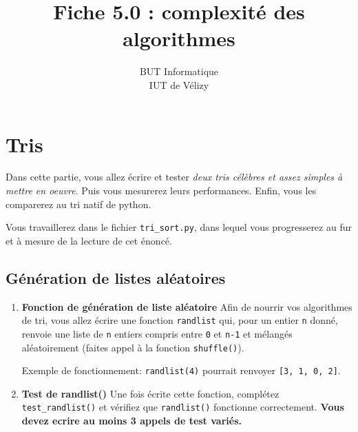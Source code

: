 \documentclass[11pt,a4paper]{article}
\title{Fiche 5.0 : complexité des algorithmes}
\author{BUT Informatique\\
IUT de Vélizy\\
}
\date{}
\newcommand{\checkbox}{$\square$ \smallskip}
\newcounter{exo} \setcounter{exo}{0}
\newenvironment{action}{%
    \begin{enumerate}[\numerotation] \addtocounter{exo}{-1}%
        }{%
    \end{enumerate}
}
\newcommand{\numexoa}{\theexo \addtocounter{exo}{1}}
\newcommand{\numerotation}{\checkbox \smallskip \numexoa.}
\begin{document}
\maketitle





\thispagestyle{empty}

\setcounter{section}{-1}
\section{Tris}
Dans cette partie, vous allez écrire et tester {\em deux tris célèbres et assez simples à mettre en oeuvre}. Puis vous mesurerez leurs performances. Enfin, vous les comparerez au tri natif de python.\ 

Vous travaillerez dans le fichier {\tt tri\_sort.py}, dans lequel vous progresserez au fur et à mesure de la lecture de cet énoncé.

\subsection*{Génération de listes aléatoires}
\begin{action}
\item {\bf Fonction de génération de liste aléatoire} Afin de nourrir vos algorithmes de tri, vous allez écrire une fonction {\tt randlist} qui, pour un entier {\tt n} donné, renvoie une liste de {\tt n} entiers compris entre {\tt 0} et {\tt n-1} et mélangés aléatoirement (faites appel à la fonction {\tt shuffle()}).\ 

Exemple de fonctionnement: {\tt randlist(4)} pourrait renvoyer {\tt [3, 1, 0, 2]}.
\item {\bf Test de {\bf randlist()}} Une fois écrite cette fonction, complétez {\tt test\_randlist()} et vérifiez que {\tt randlist()} fonctionne correctement. {\bf Vous devez ecrire au moins 3 appels de test variés.}
\end{action}
\end{document}
